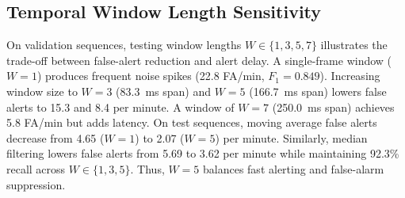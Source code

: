 \documentclass[conference]{IEEEtran}
\begin{document}
\begin{table}[!t]
\centering
\caption{Biome-Stratified Causal Decision Performance on Held-Out Test Split}
\label{tab:per_biome_benchmark}
\end{table}

\subsection{Temporal Window Length Sensitivity}
On validation sequences, testing window lengths $W \in \{1, 3, 5, 7\}$ illustrates the trade-off between false-alert reduction and alert delay. A single-frame window ($W=1$) produces frequent noise spikes (22.8 FA/min, $F_1 = 0.849$). Increasing window size to $W=3$ (83.3~ms span) and $W=5$ (166.7~ms span) lowers false alerts to 15.3 and 8.4 per minute. A window of $W=7$ (250.0~ms span) achieves 5.8 FA/min but adds latency. On test sequences, moving average false alerts decrease from 4.65 ($W=1$) to 2.07 ($W=5$) per minute. Similarly, median filtering lowers false alerts from 5.69 to 3.62 per minute while maintaining 92.3\% recall across $W \in \{1, 3, 5\}$. Thus, $W=5$ balances fast alerting and false-alarm suppression.
\end{document}
